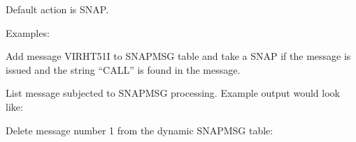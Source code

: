 \documentclass[letterpaper,10pt,english]{sphinxmanual}
\begin{document}
\sphinxAtStartPar
Default action is SNAP.

\sphinxAtStartPar
Examples:

\begin{sphinxVerbatim}[commandchars=\\\{\}]
 
\end{sphinxVerbatim}

\sphinxAtStartPar
Add message VIRHT51I to SNAPMSG table and take a SNAP if the message is issued and the string “CALL” is found in the message.

\begin{sphinxVerbatim}[commandchars=\\\{\}]
 
\end{sphinxVerbatim}

\sphinxAtStartPar
List message subjected to SNAPMSG processing. Example output would look like: \sphinxhyphen{}

\begin{sphinxVerbatim}[commandchars=\\\{\}]
 
        
  
  
   
\end{sphinxVerbatim}

\sphinxAtStartPar
Delete message number 1 from the dynamic SNAPMSG table: \sphinxhyphen{}

\begin{sphinxVerbatim}[commandchars=\\\{\}]
 
\end{sphinxVerbatim}

\ignorespaces 
\end{document}
